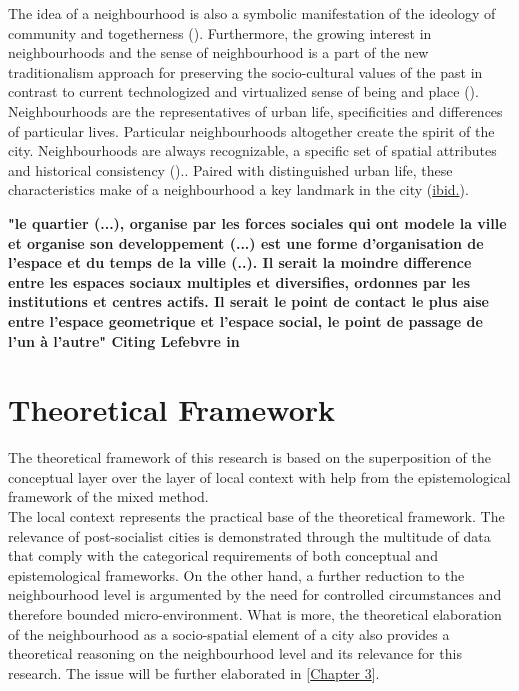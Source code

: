 \documentclass[11pt]{report}
\begin{document}
{{{{The idea of a neighbourhood is also a symbolic manifestation of the ideology of community and togetherness  (\href{Lefebvre}{\citealt{lefebvre_production_1974}}).
Furthermore, the growing interest in neighbourhoods and the sense of neighbourhood is a part of the new traditionalism approach for preserving the socio-cultural values of the past in contrast to current technologized and virtualized sense of being and place (\href{Meenakshi}{\citealt{meenakshi_neighborhood_2011}}).
Neighbourhoods are the representatives of urban life, specificities and differences of particular lives. Particular neighbourhoods altogether create the spirit of the city. Neighbourhoods are always recognizable, a specific set of spatial attributes and historical consistency  (\href{Merlin}{\citealt{choay_dictionnaire_2010}})..
Paired with distinguished urban life, these characteristics make of a neighbourhood a key landmark in the city (\href{Merlin}{ibid.}).

\textbf{"le quartier (...), organise par les forces sociales qui ont modele la ville et organise son developpement (...) est une forme d'organisation de l'espace et du temps de la ville (..). Il serait la moindre difference entre les espaces sociaux multiples et diversifies, ordonnes par les institutions et centres actifs. Il serait le point de contact le plus aise entre l'espace geometrique et l'espace social, le point de passage de l'un à l'autre" Citing Lefebvre in \href{Merlin}{\cite{choay_dictionnaire_2010}}}

\section{Theoretical Framework}

The theoretical framework of this research is based on the superposition of the conceptual layer over the layer of local context with help from the epistemological framework of the mixed method.
\\

The local context represents the practical base of the theoretical framework. The relevance of post-socialist cities is demonstrated through the multitude of data that comply with the categorical requirements of both conceptual and epistemological frameworks. On the other hand, a further reduction to the neighbourhood level is argumented by the need for controlled circumstances and therefore bounded micro-environment. What is more, the theoretical elaboration of the neighbourhood as a socio-spatial element of a city also provides a theoretical reasoning on the neighbourhood level and its relevance for this research. 
 The issue will be further elaborated in [\href{Chapter 3}{Chapter 3}].
\\

}}}}
\end{document}
